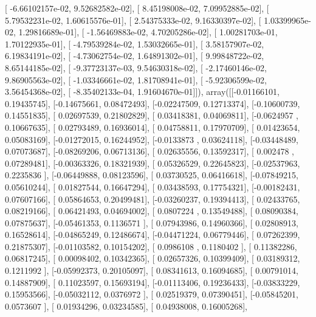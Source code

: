 \documentclass{article}
\begin{document}
       [ -6.66102157e-02,   9.52682582e-02],
       [  8.45198008e-02,   7.09952885e-02],
       [  5.79532231e-02,   1.60615576e-01],
       [  2.54375333e-02,   9.16330397e-02],
       [  1.03399965e-02,   1.29816689e-01],
       [ -1.56469883e-02,   4.70205286e-02],
       [  1.00281703e-01,   1.70122935e-01],
       [ -4.79539284e-02,   1.53032665e-01],
       [  3.58157907e-02,   6.19834191e-02],
       [ -4.73062754e-02,   1.64891302e-01],
       [  9.99848722e-02,   8.65144185e-02],
       [ -9.37723137e-03,   9.54630318e-02],
       [ -2.17460146e-02,   9.86905563e-02],
       [ -1.03346661e-02,   1.81708941e-01],
       [ -5.92306599e-02,   3.56454368e-02],
       [ -8.35402133e-04,   1.91604670e-01]]), array([[-0.01166101,  0.19435745],
       [-0.14675661,  0.08472493],
       [-0.02247509,  0.12713374],
       [-0.10600739,  0.14551835],
       [ 0.02697539,  0.21802829],
       [ 0.03418381,  0.04069811],
       [-0.0624957 ,  0.10667635],
       [ 0.02793489,  0.16936014],
       [ 0.04758811,  0.17970709],
       [ 0.01423654,  0.05083169],
       [-0.01272015,  0.16244952],
       [-0.0133873 ,  0.03624118],
       [-0.03448489,  0.07073687],
       [-0.08269206,  0.06713136],
       [ 0.02635556,  0.13592317],
       [ 0.002478  ,  0.07289481],
       [-0.00363326,  0.18321939],
       [ 0.05326529,  0.22645823],
       [-0.02537963,  0.2235836 ],
       [-0.06449888,  0.08123596],
       [ 0.03730525,  0.06416618],
       [-0.07849215,  0.05610244],
       [ 0.01827544,  0.16647294],
       [ 0.03438593,  0.17754321],
       [-0.00182431,  0.07607166],
       [ 0.05864653,  0.20499481],
       [-0.03260237,  0.19394413],
       [ 0.02433765,  0.08219166],
       [ 0.06421493,  0.04694002],
       [ 0.0807224 ,  0.13549488],
       [ 0.08090384,  0.07875637],
       [-0.05461353,  0.1136571 ],
       [ 0.07943986,  0.14960366],
       [ 0.02808913,  0.16528614],
       [-0.04865249,  0.12486674],
       [-0.04471224,  0.06779446],
       [ 0.07262399,  0.21875307],
       [-0.01103582,  0.10154202],
       [ 0.0986108 ,  0.1180402 ],
       [ 0.11382286,  0.06817245],
       [ 0.00098402,  0.10342365],
       [ 0.02657326,  0.10399409],
       [ 0.03189312,  0.1211992 ],
       [-0.05992373,  0.20105097],
       [ 0.08341613,  0.16094685],
       [ 0.00791014,  0.14887909],
       [ 0.11023597,  0.15693194],
       [-0.01113406,  0.19236433],
       [-0.03833229,  0.15953566],
       [-0.05032112,  0.0376972 ],
       [ 0.02519379,  0.07390451],
       [-0.05845201,  0.0573607 ],
       [ 0.01934296,  0.03234585],
       [ 0.04938008,  0.16005268],
\end{document}

